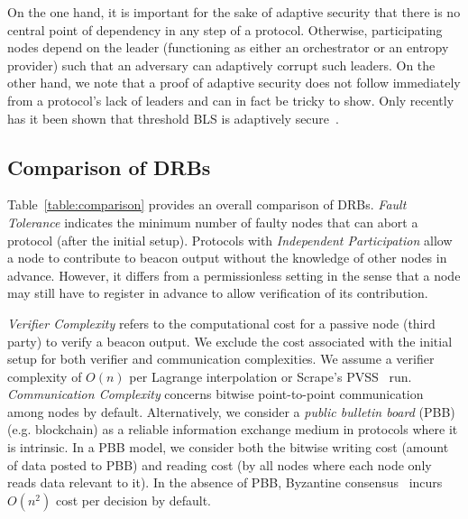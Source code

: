 On the one hand, it is important for the sake of adaptive security that there is no central point of dependency in any step of a protocol.
Otherwise, participating nodes depend on the leader (functioning as either an orchestrator or an entropy provider) such that an adversary can adaptively corrupt such leaders.
On the other hand, we note that a proof of adaptive security does not follow immediately from a protocol's lack of leaders and can in fact be tricky to show.
Only recently has it been shown that threshold BLS is adaptively secure~\cite{bacho2022adaptive}.

\subsection{Comparison of DRBs}
\label{subsection:comparison}
Table~\ref{table:comparison} provides an overall comparison of DRBs. \textit{Fault Tolerance} indicates the minimum number of faulty nodes that can abort a protocol (after the initial setup). Protocols with \textit{Independent Participation} allow a node to contribute to beacon output without the knowledge of other nodes in advance. However, it differs from a permissionless setting in the sense that a node may still have to register in advance to allow verification of its contribution.

\textit{Verifier Complexity} refers to the computational cost for a passive node (third party) to verify a beacon output. We exclude the cost associated with the initial setup for both verifier and communication complexities. We assume a verifier complexity of $O(n)$ per Lagrange interpolation or Scrape's PVSS~\cite{cascudo2017scrape} run. \textit{Communication Complexity} concerns bitwise point-to-point communication among nodes by default. Alternatively, we consider a \textit{public bulletin board} (PBB) (e.g. blockchain) as a reliable information exchange medium in protocols where it is intrinsic. In a PBB model, we consider both the bitwise writing cost (amount of data posted to PBB) and reading cost (by all nodes where each node only reads data relevant to it). In the absence of PBB, Byzantine consensus~\cite{castro1999practical} incurs $O(n^2)$ cost per decision by default.

